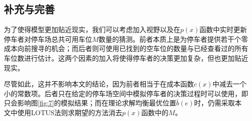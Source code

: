 \documentclass{thuemp}
\begin{document}
\subsection{补充与完善}
\par 为了使得模型更加贴近现实，我们可以考虑加入视野以及在$p(x)$函数中实时更新停车者对停车场总共可用车位$M$数量的猜测。前者本质上是为停车者提供若干个零成本向前搜寻的机会；而后者则可使用已找到的空车位的数量与已经查看过的所有车位数进行估计。这两个因素的加入将使得停车者的决策更加复杂，但也更加贴近现实。
\par 尽管如此，这并不影响本文的结论，因为前者相当于在成本函数$c(x)$中减去一个小的常数项。后者只在给定的停车场空间中模拟停车者的决策过程时可以使用，即只会影响图\ref{fig:7}的模拟结果；而在理论求解均衡最优位置$\bar{b}(e)$时，仍需采取本文中使用LOTUS法则求期望的方法消去$p(x)$函数中的$M$。




 
\end{document}
